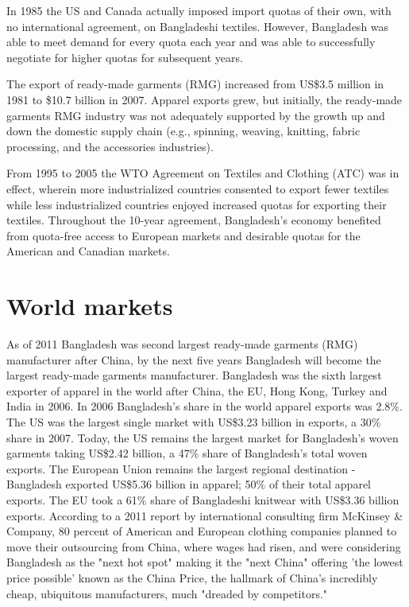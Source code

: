 \documentclass[conference]{IEEEtran}
\begin{document}
In 1985 the US and Canada actually imposed import quotas of their own, with no international agreement, on Bangladeshi textiles. However, Bangladesh was able to meet demand for every quota each year and was able to successfully negotiate for higher quotas for subsequent years.

The export of ready-made garments (RMG) increased from US\$3.5 million in 1981 to \$10.7 billion in 2007. Apparel exports grew, but initially, the ready-made garments RMG industry was not adequately supported by the growth up and down the domestic supply chain (e.g., spinning, weaving, knitting, fabric processing, and the accessories industries).

From 1995 to 2005 the WTO Agreement on Textiles and Clothing (ATC) was in effect, wherein more industrialized countries consented to export fewer textiles while less industrialized countries enjoyed increased quotas for exporting their textiles. Throughout the 10-year agreement, Bangladesh's economy benefited from quota-free access to European markets and desirable quotas for the American and Canadian markets.

\section{World markets}
As of 2011 Bangladesh was second largest ready-made garments (RMG) manufacturer after China, by the next five years Bangladesh will become the largest ready-made garments manufacturer. Bangladesh was the sixth largest exporter of apparel in the world after China, the EU, Hong Kong, Turkey and India in 2006. In 2006 Bangladesh's share in the world apparel exports was 2.8\%. The US was the largest single market with US\$3.23 billion in exports, a 30\% share in 2007. Today, the US remains the largest market for Bangladesh's woven garments taking US\$2.42 billion, a 47\% share of Bangladesh's total woven exports. The European Union remains the largest regional destination - Bangladesh exported US\$5.36 billion in apparel; 50\% of their total apparel exports. The EU took a 61\% share of Bangladeshi knitwear with US\$3.36 billion exports.
According to a 2011 report by international consulting firm McKinsey \& Company, 80 percent of American and European clothing companies planned to move their outsourcing from China, where wages had risen, and were considering Bangladesh as the "next hot spot" making it the "next China" offering 'the lowest price possible' known as the China Price, the hallmark of China's incredibly cheap, ubiquitous manufacturers, much "dreaded by competitors."\\
\end{document}
